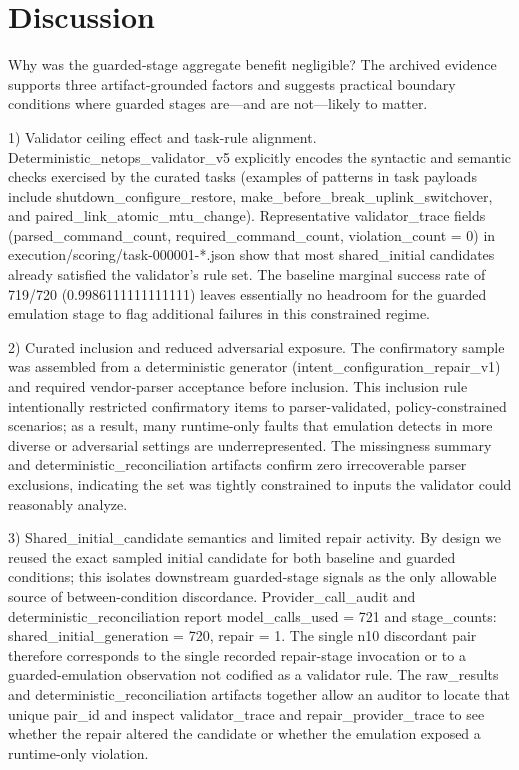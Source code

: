 \documentclass[conference]{IEEEtran}
\begin{document}
\section{Discussion}
Why was the guarded-stage aggregate benefit negligible? The archived evidence supports three artifact-grounded factors and suggests practical boundary conditions where guarded stages are---and are not---likely to matter.

1) Validator ceiling effect and task-rule alignment. Deterministic\_netops\_validator\_v5 explicitly encodes the syntactic and semantic checks exercised by the curated tasks (examples of patterns in task payloads include shutdown\_configure\_restore, make\_before\_break\_uplink\_switchover, and paired\_link\_atomic\_mtu\_change). Representative validator\_trace fields (parsed\_command\_count, required\_command\_count, violation\_count = 0) in execution/scoring/task-000001-*.json show that most shared\_initial candidates already satisfied the validator's rule set. The baseline marginal success rate of 719/720 (0.9986111111111111) leaves essentially no headroom for the guarded emulation stage to flag additional failures in this constrained regime.

2) Curated inclusion and reduced adversarial exposure. The confirmatory sample was assembled from a deterministic generator (intent\_configuration\_repair\_v1) and required vendor-parser acceptance before inclusion. This inclusion rule intentionally restricted confirmatory items to parser-validated, policy-constrained scenarios; as a result, many runtime-only faults that emulation detects in more diverse or adversarial settings are underrepresented. The missingness summary and deterministic\_reconciliation artifacts confirm zero irrecoverable parser exclusions, indicating the set was tightly constrained to inputs the validator could reasonably analyze.

3) Shared\_initial\_candidate semantics and limited repair activity. By design we reused the exact sampled initial candidate for both baseline and guarded conditions; this isolates downstream guarded-stage signals as the only allowable source of between-condition discordance. Provider\_call\_audit and deterministic\_reconciliation report model\_calls\_used = 721 and stage\_counts: shared\_initial\_generation = 720, repair = 1. The single n10 discordant pair therefore corresponds to the single recorded repair-stage invocation or to a guarded-emulation observation not codified as a validator rule. The raw\_results and deterministic\_reconciliation artifacts together allow an auditor to locate that unique pair\_id and inspect validator\_trace and repair\_provider\_trace to see whether the repair altered the candidate or whether the emulation exposed a runtime-only violation.
\end{document}
